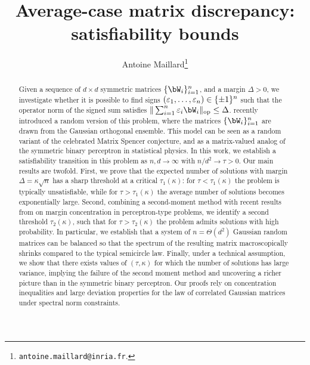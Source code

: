 \documentclass[a4paper,11pt]{article}
\newcommand{\change}[1]{{\color{NavyBlue} #1}}
\begin{document}
\title{Average-case matrix discrepancy: satisfiability bounds}
\date{}
\author{Antoine Maillard\thanks{\texttt{antoine.maillard@inria.fr}.}}

\maketitle

\begin{abstract}
    Given a sequence of $d \times d$ symmetric matrices $\{\bW_i\}_{i=1}^n$, and a margin $\Delta > 0$, we investigate whether it is possible to find signs $(\varepsilon_1, \dots, \varepsilon_n) \in \{\pm 1\}^n$ such that the operator norm of the signed sum satisfies $\|\sum_{i=1}^n \eps_i \bW_i\|_\op \leq \Delta$.
    \cite{kunisky2023online} recently introduced a random version of this problem, where the matrices $\{\bW_i\}_{i=1}^n$ are drawn from the Gaussian orthogonal ensemble. 
    This model can be seen as a random variant of the celebrated Matrix Spencer conjecture, and as a matrix-valued analog of the symmetric binary perceptron in statistical physics.
%
    In this work, we establish a satisfiability transition in this problem as $n, d \to \infty$ with $n / d^2 \to \tau > 0$.
    Our main results are twofold.
    First, we prove that the expected number of solutions with margin $\Delta = \kappa \sqrt{n}$ has a sharp threshold at a critical $\tau_1(\kappa)$: 
    for $\tau < \tau_1(\kappa)$ the problem is typically unsatisfiable, while for $\tau > \tau_1(\kappa)$ the average number of solutions becomes exponentially large.
    Second, combining a second-moment method with recent results from \cite{altschuler2023zero} on margin concentration in perceptron-type problems, we identify a second threshold $\tau_2(\kappa)$, 
    such that for $\tau > \tau_2(\kappa)$ the problem admits solutions with high probability.
%
    In particular, we establish that a system of $n = \Theta(d^2)$ Gaussian random matrices can be balanced so that the spectrum of the resulting matrix macroscopically shrinks compared to the typical semicircle law.
    Finally, under a technical assumption, we show that there exists values of $(\tau,\kappa)$ for which the \change{number of solutions has large variance}, 
    implying the failure of the second moment method and uncovering a richer picture than in the symmetric binary perceptron.
    Our proofs rely on concentration inequalities and large deviation properties for the law of correlated Gaussian matrices under spectral norm constraints.
\end{abstract}
\end{document}
